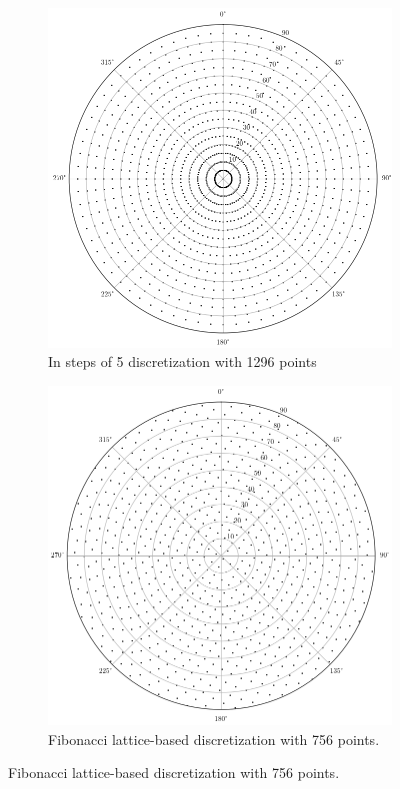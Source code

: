 \begin{figure}
     \centering
     \begin{subfigure}[b]{0.45\textwidth}
         \centering
         \includegraphics[width=\textwidth]{pics/disc5}
         \caption{In steps of 5 discretization with 1296 points}
         \label{fig_5step}
     \end{subfigure}
     \hfill
     \begin{subfigure}[b]{0.45\textwidth}
         \centering
         \includegraphics[width=\textwidth]{pics/fibolat1}
         \caption{Fibonacci lattice-based discretization with 756 points.}
         \label{fig_fibolat}
     \end{subfigure}
     \hfill
     

\end{figure}
